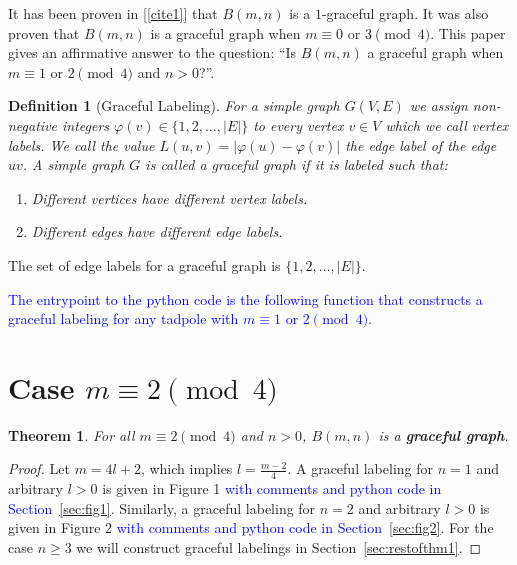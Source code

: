 \documentclass[fleqn,svgnames,screen,acmsmall]{ml2rcn}
\newcommand{\additionalcomment}[1]{\textcolor{blue}{#1}}
\newtheorem{theorem}{Theorem}
\newtheorem{definition}{Definition}
\begin{document}
It has been proven in [\ref{cite1}] that \(B(m,n)\) is a \(1\)-graceful graph.
It was also proven that \(B(m,n)\) is a graceful graph when
\(m \equiv 0\) or \(3 \pmod 4\). This paper gives an affirmative answer to the question: ``Is \(B(m,n)\) a graceful graph when
\(m \equiv 1\) or \(2 \pmod 4\) and \(n > 0\)?''.

\begin{definition}[Graceful Labeling]
\label{graceful-graph-definition}
  For a simple graph \(G(V, E)\) we assign non-negative integers \(\varphi(v) \in \{1, 2, \ldots, |E|\}\) to every vertex \(v \in V\) which we call \emph{vertex labels}. 
  We call the value \(L(u, v) = |\varphi(u) - \varphi(v)|\) the \emph{edge label} of the edge \(uv\). 
  A simple graph \(G\) is called a \emph{graceful
  graph} if it is labeled such that: 
  \begin{enumerate}
    \item Different vertices have different vertex labels. 
    \item Different edges have different edge labels.
  \end{enumerate}
\end{definition}

The set of edge labels for a graceful graph is
\(\{1, 2, \ldots, |E|\}\). 

\additionalcomment{The entrypoint to the python code is the following function that constructs a graceful labeling for any tadpole with \(m \equiv 1\) or \(2 \pmod 4\).}

\vspace{0.5\baselineskip}

\section{\texorpdfstring{Case
\(m \equiv 2 \pmod 4\)}{Case m \textbackslash equiv 2 \textbackslash pmod 4}}\label{theorem-1-case-m-equiv-2-pmod-4}

\begin{theorem}
For all \(m \equiv 2 \pmod 4\) and \(n > 0\),
\(B(m,n)\) is a \textbf{graceful graph}.
\end{theorem}

\begin{proof}
Let \(m = 4l + 2\), which implies \(l = \frac{m-2}{4}\).
A graceful labeling for $n=1$ and arbitrary $l>0$ is given in Figure 1 \additionalcomment{with comments and python code in Section~\ref{sec:fig1}}.%
Similarly, a graceful labeling for $n=2$ and arbitrary $l>0$ is given in Figure 2 \additionalcomment{with comments and python code in Section~\ref{sec:fig2}}. 
For the case \(n \ge 3\) we will construct graceful labelings in Section~\ref{sec:restofthm1}.
\end{proof} 
\end{document}
